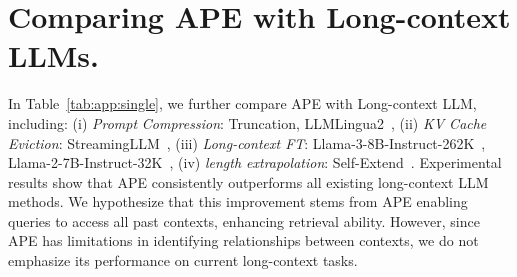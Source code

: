 \section{Comparing APE with Long-context LLMs.}
\label{sec:app:lclm}

\begin{table}[ht]
\centering
\caption{\textbf{Performance comparison between APE and long-context LLMs on LongBench~\citep{bai2023longbench}.}}
\label{tab:app:single}
\end{table}

In Table~\ref{tab:app:single}, we further compare APE with Long-context LLM, including: (i) \textit{Prompt} \textit{Compression}: Truncation, LLMLingua2~\citep{pan2024llmlingua}, (ii) \textit{KV Cache Eviction}: StreamingLLM~\citep{xiao2023efficient}, (iii) \textit{Long-context FT}: Llama-3-8B-Instruct-262K~\citep{gradllama}, Llama-2-7B-Instruct-32K~\citep{togetherllama}, (iv) \textit{length extrapolation}: Self-Extend~\citep{jin2024llm}. Experimental results show that APE consistently outperforms all existing long-context LLM methods. We hypothesize that this improvement stems from APE enabling queries to access all past contexts, enhancing retrieval ability. However, since APE has limitations in identifying relationships between contexts, we do not emphasize its performance on current long-context tasks.

